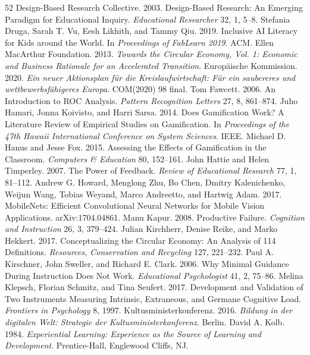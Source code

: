 \documentclass[sigconf,nonacm]{acmart}
\begin{document}
\begin{thebibliography}{52}
 Design-Based Research Collective. 2003. Design-Based Research: An Emerging Paradigm for Educational Inquiry. \textit{Educational Researcher} 32, 1, 5--8.
 Stefania Druga, Sarah T. Vu, Eesh Likhith, and Tammy Qiu. 2019. Inclusive AI Literacy for Kids around the World. In \textit{Proceedings of FabLearn 2019}. ACM.
 Ellen MacArthur Foundation. 2013. \textit{Towards the Circular Economy, Vol. 1: Economic and Business Rationale for an Accelerated Transition}.
 Europäische Kommission. 2020. \textit{Ein neuer Aktionsplan für die Kreislaufwirtschaft: Für ein saubereres und wettbewerbsfähigeres Europa}. COM(2020) 98 final.
 Tom Fawcett. 2006. An Introduction to ROC Analysis. \textit{Pattern Recognition Letters} 27, 8, 861--874.
 Juho Hamari, Jonna Koivisto, and Harri Sarsa. 2014. Does Gamification Work? A Literature Review of Empirical Studies on Gamification. In \textit{Proceedings of the 47th Hawaii International Conference on System Sciences}. IEEE.
 Michael D. Hanus and Jesse Fox. 2015. Assessing the Effects of Gamification in the Classroom. \textit{Computers \& Education} 80, 152--161.
 John Hattie and Helen Timperley. 2007. The Power of Feedback. \textit{Review of Educational Research} 77, 1, 81--112.
 Andrew G. Howard, Menglong Zhu, Bo Chen, Dmitry Kalenichenko, Weijun Wang, Tobias Weyand, Marco Andreetto, and Hartwig Adam. 2017. MobileNets: Efficient Convolutional Neural Networks for Mobile Vision Applications. arXiv:1704.04861.
 Manu Kapur. 2008. Productive Failure. \textit{Cognition and Instruction} 26, 3, 379--424.
 Julian Kirchherr, Denise Reike, and Marko Hekkert. 2017. Conceptualizing the Circular Economy: An Analysis of 114 Definitions. \textit{Resources, Conservation and Recycling} 127, 221--232.
 Paul A. Kirschner, John Sweller, and Richard E. Clark. 2006. Why Minimal Guidance During Instruction Does Not Work. \textit{Educational Psychologist} 41, 2, 75--86.
 Melina Klepsch, Florian Schmitz, and Tina Seufert. 2017. Development and Validation of Two Instruments Measuring Intrinsic, Extraneous, and Germane Cognitive Load. \textit{Frontiers in Psychology} 8, 1997.
 Kultusministerkonferenz. 2016. \textit{Bildung in der digitalen Welt: Strategie der Kultusministerkonferenz}. Berlin.
 David A. Kolb. 1984. \textit{Experiential Learning: Experience as the Source of Learning and Development}. Prentice-Hall, Englewood Cliffs, NJ.

\end{thebibliography}
\end{document}
